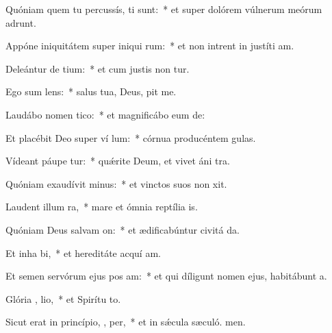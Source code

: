\item Quóniam quem tu percussís, ti sunt:~* et super dolórem vúlnerum meórum adrunt.
\item Appóne iniquitátem super iniqui rum:~* et non intrent in justíti am.
\item Deleántur de  tium:~* et cum justis non tur.
\item Ego sum   lens:~* salus tua, Deus, pit me.
\item Laudábo nomen   tico:~* et magnificábo eum  de:
\item Et placébit Deo super ví lum:~* córnua producéntem  gulas.
\item Vídeant páupe  tur:~* quǽrite Deum, et vivet áni tra.
\item Quóniam exaudívit  minus:~* et vinctos suos non xit.
\item Laudent illum   ra,~* mare et ómnia reptília  is.
\item Quóniam Deus salvam  on:~* et ædificabúntur civitá da.
\item Et inha bi,~* et hereditáte acquí am.
\item Et semen servórum ejus pos am:~* et qui díligunt nomen ejus, habitábunt  a.
\item Glória ,  lio,~* et Spirítu to.
\item Sicut erat in princípio,  ,  per,~* et in sǽcula sæculó. men.
